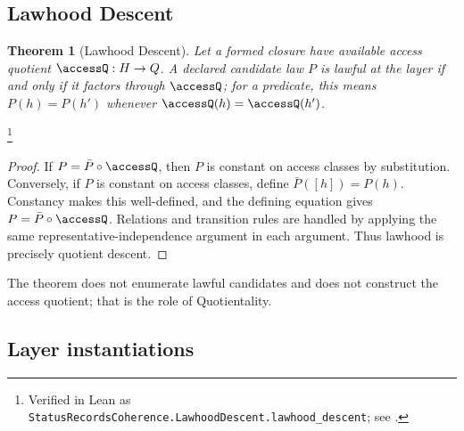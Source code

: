 \documentclass[11pt]{article}
\newtheorem{theorem}{Theorem}[section]
\theoremstyle{definition}
\begin{document}
\subsection{Lawhood Descent}\label{sec:status-records-coherence:lawhood-descent}

\begin{theorem}[Lawhood Descent]\label{thm:F18}
Let a formed closure have available access quotient
\(\accessQ:H\to Q\).  A declared candidate law \(P\) is lawful at the
layer if and only if it factors through \(\accessQ\); for a predicate,
this means \(P(h)=P(h')\) whenever \(\accessQ(h)=\accessQ(h')\).
\end{theorem}
\footnote{\raggedright Verified in Lean as
\texttt{StatusRecordsCoherence.LawhoodDescent.\allowbreak{}lawhood\_descent};
see .}
\begin{proof}
If \(P=\bar P\circ\accessQ\), then \(P\) is constant on access
classes by substitution.  Conversely, if \(P\) is constant on access
classes, define \(\bar P([h])=P(h)\).  Constancy makes this
well-defined, and the defining equation gives
\(P=\bar P\circ\accessQ\).  Relations and transition rules are handled
by applying the same representative-independence argument in each
argument.  Thus lawhood is precisely quotient descent.
\end{proof}

The theorem does not enumerate lawful candidates and does not
construct the access quotient; that is the role of Quotientality.

\subsection*{Layer instantiations}\label{layer-inst:F18}
\end{document}
